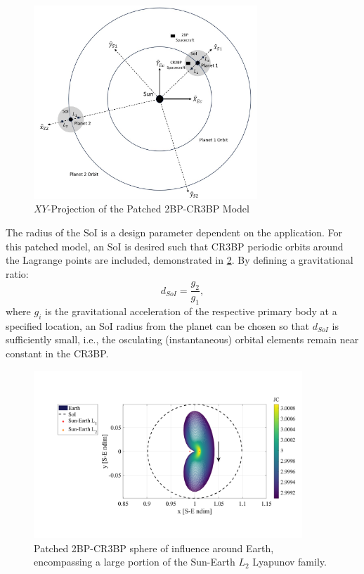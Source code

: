 \begin{figure}[ht]
    \centering
    \includegraphics[width=0.75\textwidth]{figures/TBP-CR3BP.jpg}
    \caption{$XY$-Projection of the Patched 2BP-CR3BP Model}
    \label{fig:2BP-CR3BP}
\end{figure}

The radius of the SoI is a design parameter dependent on the application. For this patched model,
an SoI is desired such that CR3BP periodic orbits around the Lagrange points are included,
demonstrated in \cref{fig:SoI}. By defining a gravitational ratio:
\begin{equation}
    d_{SoI}=\frac{g_{2}}{g_{1}},
    \label{eq:patchedSoI}
\end{equation}
where $g_{i}$ is the gravitational acceleration of the respective primary body at a specified
location, an SoI radius from the planet can be chosen so that $d_{SoI}$ is sufficiently small,
i.e., the osculating (instantaneous) orbital elements remain near constant in the
CR3BP\cite{Canales:2021b}.

\begin{figure}[ht]
    \centering
    \includegraphics[width=0.9\textwidth]{figures/SoI.pdf}
    \caption{Patched 2BP-CR3BP sphere of influence around Earth, encompassing a large portion of the Sun-Earth $L_{2}$ Lyapunov family.}
    \label{fig:SoI}
\end{figure}

